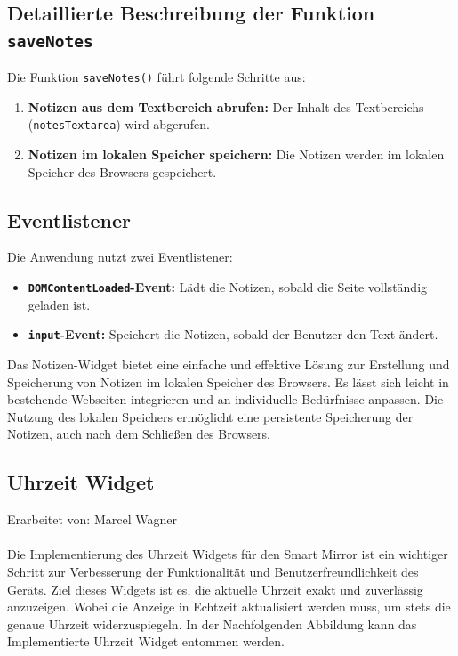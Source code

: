 \subsection*{Detaillierte Beschreibung der Funktion \texttt{saveNotes}}
Die Funktion \texttt{saveNotes()} führt folgende Schritte aus:

\begin{enumerate}
    \item \textbf{Notizen aus dem Textbereich abrufen:}
    Der Inhalt des Textbereichs (\texttt{notesTextarea}) wird abgerufen.
    
    \item \textbf{Notizen im lokalen Speicher speichern:}
    Die Notizen werden im lokalen Speicher des Browsers gespeichert.
\end{enumerate}

\subsection*{Eventlistener}
Die Anwendung nutzt zwei Eventlistener:

\begin{itemize}
    \item \textbf{\texttt{DOMContentLoaded}-Event:}
    Lädt die Notizen, sobald die Seite vollständig geladen ist.
    
    \item \textbf{\texttt{input}-Event:}
    Speichert die Notizen, sobald der Benutzer den Text ändert.
\end{itemize}

\noindent
Das Notizen-Widget bietet eine einfache und effektive Lösung zur Erstellung und Speicherung von Notizen im lokalen Speicher des Browsers. Es lässt sich leicht in bestehende Webseiten integrieren und an individuelle Bedürfnisse anpassen. Die Nutzung des lokalen Speichers ermöglicht eine persistente Speicherung der Notizen, auch nach dem Schließen des Browsers.

\newpage

\subsection{Uhrzeit Widget}
Erarbeitet von: Marcel Wagner \\ \\
\noindent
Die Implementierung des Uhrzeit Widgets für den Smart Mirror ist ein wichtiger Schritt zur Verbesserung der Funktionalität und Benutzerfreundlichkeit des Geräts. Ziel dieses Widgets ist es, die aktuelle Uhrzeit exakt und zuverlässig anzuzeigen. Wobei die Anzeige in Echtzeit aktualisiert werden muss, um stets die genaue Uhrzeit widerzuspiegeln. In der Nachfolgenden Abbildung kann das Implementierte Uhrzeit Widget entommen werden.\\ \\

